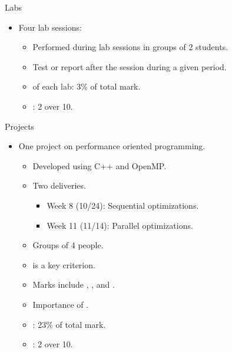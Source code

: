 \begin{frame}[t]{Labs}
\begin{itemize}
  \item Four lab sessions:
    \begin{itemize}
        \item Performed during lab sessions in groups of 2 students.
        \item Test or report after the session during a given period.
        \item {} of each lab: 3\% of total mark.
        \item {}: 2 over 10.
    \end{itemize}
\end{itemize}
\end{frame}

\begin{frame}[t]{Projects}
\begin{itemize}
  \item One project on performance oriented programming.
    \begin{itemize}
        \item Developed using C++ and OpenMP.
        \item Two deliveries.
        \begin{itemize}
          \item Week 8 (10/24): Sequential optimizations.
          \item Week 11 (11/14): Parallel optimizations.
        \end{itemize}

        \item Groups of 4 people.
        \item {} is a key criterion.
        \item Marks include , , 
              and .
        \item Importance of .
        \item {}: 23\% of total mark.
        \item {}: 2 over 10.
    \end{itemize}
\end{itemize}
\end{frame}

